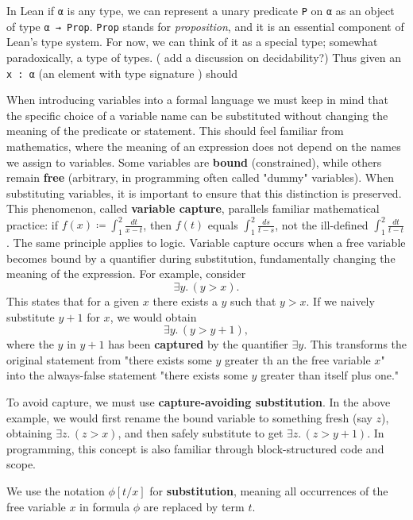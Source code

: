 In Lean if \lstinline[language=lean]|α| is any type, we can represent a 
unary predicate \lstinline[language=lean]|P| on \lstinline[language=lean]|α|  as 
an object of type \lstinline[language=lean]|α → Prop|.
\lstinline[language=lean]|Prop| stands for \emph{proposition}, and it is an 
essential component of Lean’s type system.
For now, we can think of it as a special type; somewhat 
paradoxically, a type of types. ( add a discussion on decidability?)
Thus given an \lstinline[language=lean]|x : α| (an element with type signature ) should  

When introducing variables into a formal language we must keep in mind that the specific choice 
of a variable name can be substituted without 
changing the meaning of the predicate or statement. This should feel familiar from mathematics, 
where the meaning of an expression does not depend on the names we assign to variables.
Some variables are \textbf{bound} (constrained), while others remain \textbf{free} 
(arbitrary, in programming often called "dummy" variables). 
When substituting variables, it is important to ensure that this distinction is preserved.
This phenomenon, called \textbf{variable capture}, parallels familiar mathematical practice: 
if $f(x) \coloneqq \int_1^2 \frac{dt}{x-t}$, then $f(t)$ equals $\int_1^2 \frac{ds}{t-s}$, 
not the ill-defined $\int_1^2 \frac{dt}{t-t}$. The same principle applies to logic.
Variable capture occurs when a free variable becomes bound by a quantifier during substitution, 
fundamentally changing the meaning of the expression. For example, consider
\[
\exists y.\,(y > x).
\]
This states that for a given $x$ there exists a $y$ such that $y > x$. 
If we naively substitute $y+1$ for $x$, we would obtain
\[
\exists y.\,(y > y+1),
\]
where the $y$ in $y+1$ has been \textbf{captured} by the quantifier $\exists y$. 
This transforms the original statement from "there exists some $y$ greater th
an the free variable $x$" into the always-false statement 
"there exists some $y$ greater than itself plus one."

To avoid capture, we must use \textbf{capture-avoiding substitution}. 
In the above example, we would first rename the bound variable to something fresh 
(say $z$), obtaining $\exists z.\,(z > x)$, and then safely substitute to get $\exists z.\,(z > y+1)$.
In programming, this concept is also familiar through block-structured code and scope. 

We use the notation $\phi[t/x]$ for \textbf{substitution}, meaning all occurrences of the free 
variable $x$ in formula $\phi$ are replaced by term $t$.

